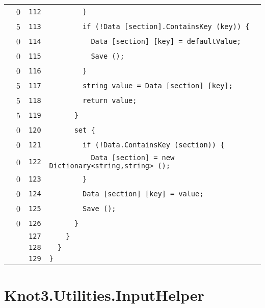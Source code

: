 \documentclass[a4paper,10pt]{article}
\begin{document}
\begin{longtable}[l]{lrrl}
\cellcolor{red} & 0 & \verb~112~ & \verb~        }~\\
\cellcolor{green} & 5 & \verb~113~ & \verb~        if (!Data [section].ContainsKey (key)) {~\\
\cellcolor{red} & 0 & \verb~114~ & \verb~          Data [section] [key] = defaultValue;~\\
\cellcolor{red} & 0 & \verb~115~ & \verb~          Save ();~\\
\cellcolor{red} & 0 & \verb~116~ & \verb~        }~\\
\cellcolor{green} & 5 & \verb~117~ & \verb~        string value = Data [section] [key];~\\
\cellcolor{green} & 5 & \verb~118~ & \verb~        return value;~\\
\cellcolor{green} & 5 & \verb~119~ & \verb~      }~\\
\cellcolor{red} & 0 & \verb~120~ & \verb~      set {~\\
\cellcolor{red} & 0 & \verb~121~ & \verb~        if (!Data.ContainsKey (section)) {~\\
\cellcolor{red} & 0 & \verb~122~ & \verb~          Data [section] = new Dictionary<string,string> ();~\\
\cellcolor{red} & 0 & \verb~123~ & \verb~        }~\\
\cellcolor{red} & 0 & \verb~124~ & \verb~        Data [section] [key] = value;~\\
\cellcolor{red} & 0 & \verb~125~ & \verb~        Save ();~\\
\cellcolor{red} & 0 & \verb~126~ & \verb~      }~\\
\cellcolor{gray} &  & \verb~127~ & \verb~    }~\\
\cellcolor{gray} &  & \verb~128~ & \verb~  }~\\
\cellcolor{gray} &  & \verb~129~ & \verb~}~\\
\end{longtable}
\newpage
\section{Knot3.Utilities.InputHelper}
\end{document}

